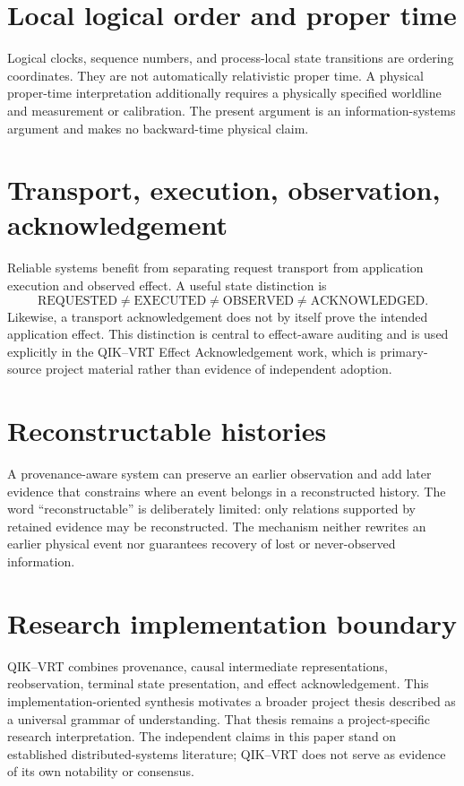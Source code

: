 \documentclass[11pt]{article}
\begin{document}
\section{Local logical order and proper time}
Logical clocks, sequence numbers, and process-local state transitions are ordering coordinates. They are not automatically relativistic proper time. A physical proper-time interpretation additionally requires a physically specified worldline and measurement or calibration. The present argument is an information-systems argument and makes no backward-time physical claim.

\section{Transport, execution, observation, acknowledgement}
Reliable systems benefit from separating request transport from application execution and observed effect. A useful state distinction is
\[
\mathrm{REQUESTED}\neq\mathrm{EXECUTED}\neq\mathrm{OBSERVED}\neq\mathrm{ACKNOWLEDGED}.
\]
Likewise, a transport acknowledgement does not by itself prove the intended application effect. This distinction is central to effect-aware auditing and is used explicitly in the QIK--VRT Effect Acknowledgement work, which is primary-source project material rather than evidence of independent adoption.

\section{Reconstructable histories}
A provenance-aware system can preserve an earlier observation and add later evidence that constrains where an event belongs in a reconstructed history. The word ``reconstructable'' is deliberately limited: only relations supported by retained evidence may be reconstructed. The mechanism neither rewrites an earlier physical event nor guarantees recovery of lost or never-observed information.

\section{Research implementation boundary}
QIK--VRT combines provenance, causal intermediate representations, reobservation, terminal state presentation, and effect acknowledgement. This implementation-oriented synthesis motivates a broader project thesis described as a universal grammar of understanding. That thesis remains a project-specific research interpretation. The independent claims in this paper stand on established distributed-systems literature; QIK--VRT does not serve as evidence of its own notability or consensus.
\end{document}
